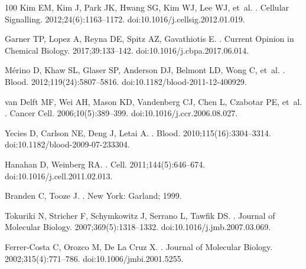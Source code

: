 \documentclass[10pt,letterpaper]{article}
\begin{document}
\begin{thebibliography}{100}
Kim EM, Kim J, Park JK, Hwang SG, Kim WJ, Lee WJ, et~al.
.
\newblock Cellular Signalling. 2012;24(6):1163--1172.
\newblock doi:{10.1016/j.cellsig.2012.01.019}.

Garner TP, Lopez A, Reyna DE, Spitz AZ, Gavathiotis E.
.
\newblock Current Opinion in Chemical Biology. 2017;39:133--142.
\newblock doi:{10.1016/j.cbpa.2017.06.014}.

M{\'{e}}rino D, Khaw SL, Glaser SP, Anderson DJ, Belmont LD, Wong C, et~al.
.
\newblock Blood. 2012;119(24):5807--5816.
\newblock doi:{10.1182/blood-2011-12-400929}.

van Delft MF, Wei AH, Mason KD, Vandenberg CJ, Chen L, Czabotar PE, et~al.
.
\newblock Cancer Cell. 2006;10(5):389--399.
\newblock doi:{10.1016/j.ccr.2006.08.027}.

Yecies D, Carlson NE, Deng J, Letai A.
.
\newblock Blood. 2010;115(16):3304--3314.
\newblock doi:{10.1182/blood-2009-07-233304.}

Hanahan D, Weinberg RA.
.
\newblock Cell. 2011;144(5):646--674.
\newblock doi:{10.1016/j.cell.2011.02.013}.

Branden C, Tooze J.
.
\newblock New York: Garland; 1999.

Tokuriki N, Stricher F, Schymkowitz J, Serrano L, Tawfik DS.
.
\newblock Journal of Molecular Biology. 2007;369(5):1318--1332.
\newblock doi:{10.1016/j.jmb.2007.03.069}.

Ferrer-Costa C, Orozco M, {De La Cruz} X.
.
\newblock Journal of Molecular Biology. 2002;315(4):771--786.
\newblock doi:{10.1006/jmbi.2001.5255}.


\end{thebibliography}
\end{document}
